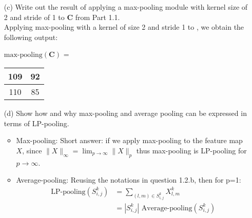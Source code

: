 \documentclass[11pt]{article}
\newcommand{\0}{\mat{0}}
\newcommand{\matr}[1]{\bm{#1}}     %
\begin{document}
\begin{itemize}
    
    \item[(c)] Write out the result of applying a max-pooling module with kernel size of 2 and stride of 1 to $\matr{C}$ from Part 1.1.\\
    \smallskip
    Applying max-pooling with a kernel of size 2 and stride 1 to , we obtain the following output:
    
    	    \begin{table}[!ht]
		    \centering
    		$\text{max-pooling} (\matr{C})$ = \begin{tabular}{|c|c|} 
    			\hline
			109 & 92 \\ \hline 
		        110 & 85 \\ \hline
   		 \end{tabular}
    	  \end{table}

    
    \item[(d)] Show how and why max-pooling and average pooling can be expressed in terms of LP-pooling.\\
    \smallskip
    	\begin{itemize}
		\item Max-pooling:
		    Short answer: if we apply max-pooling to the feature map $X$, 
    		    since $\|X\|_{\infty} = \lim_{p \to \infty} \|X\|_p$ thus max-pooling is LP-pooling for $p \to \infty$.
		\item Average-pooling:
		Reusing the notations in question 1.2.b, then for p=1:
		\begin{align*}
			\text{LP-pooling} (S^k_{i,j})  &=  \sum_{(l,m) \in  S^{k}_{i,j}} X^k_{l,m} \\
						&= |  S^{k}_{i,j} | \text{ Average-pooling}(S^k_{i,j})
		\end{align*}
		   
 	\end{itemize}   
\end{itemize}
\end{document}
